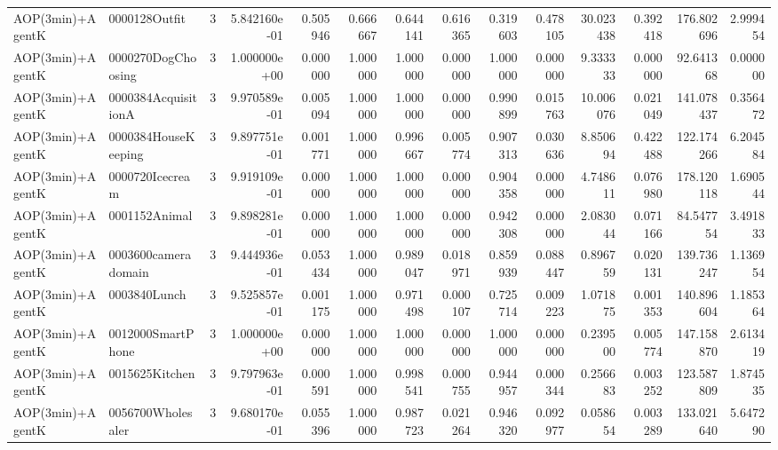 \begin{tabular}{llrr|r|rr|rr|rr|rrr}
         AOP(3min)+AgentK &          0000128Outfit &       3 & 5.842160e-01 & 0.505946 & 0.666667 &      0.644141 & 0.616365 &      0.319603 & 0.478105 &     30.023438 &    0.392418 &   176.802696 &    2.999454 \\
         AOP(3min)+AgentK &     0000270DogChoosing &       3 & 1.000000e+00 & 0.000000 & 1.000000 &      1.000000 & 0.000000 &      1.000000 & 0.000000 &      9.333333 &    0.000000 &    92.641368 &    0.000000 \\
         AOP(3min)+AgentK &    0000384AcquisitionA &       3 & 9.970589e-01 & 0.005094 & 1.000000 &      1.000000 & 0.000000 &      0.990899 & 0.015763 &     10.006076 &    0.021049 &   141.078437 &    0.356472 \\
         AOP(3min)+AgentK &    0000384HouseKeeping &       3 & 9.897751e-01 & 0.001771 & 1.000000 &      0.996667 & 0.005774 &      0.907313 & 0.030636 &      8.850694 &    0.422488 &   122.174266 &    6.204584 \\
         AOP(3min)+AgentK &        0000720Icecream &       3 & 9.919109e-01 & 0.000000 & 1.000000 &      1.000000 & 0.000000 &      0.904358 & 0.000000 &      4.748611 &    0.076980 &   178.120118 &    1.690544 \\
         AOP(3min)+AgentK &          0001152Animal &       3 & 9.898281e-01 & 0.000000 & 1.000000 &      1.000000 & 0.000000 &      0.942308 & 0.000000 &      2.083044 &    0.071166 &    84.547754 &    3.491833 \\
         AOP(3min)+AgentK &    0003600cameradomain &       3 & 9.444936e-01 & 0.053434 & 1.000000 &      0.989047 & 0.018971 &      0.859939 & 0.088447 &      0.896759 &    0.020131 &   139.736247 &    1.136954 \\
         AOP(3min)+AgentK &           0003840Lunch &       3 & 9.525857e-01 & 0.001175 & 1.000000 &      0.971498 & 0.000107 &      0.725714 & 0.009223 &      1.071875 &    0.001353 &   140.896604 &    1.185364 \\
         AOP(3min)+AgentK &      0012000SmartPhone &       3 & 1.000000e+00 & 0.000000 & 1.000000 &      1.000000 & 0.000000 &      1.000000 & 0.000000 &      0.239500 &    0.005774 &   147.158870 &    2.613419 \\
         AOP(3min)+AgentK &         0015625Kitchen &       3 & 9.797963e-01 & 0.000591 & 1.000000 &      0.998541 & 0.000755 &      0.944957 & 0.000344 &      0.256683 &    0.003252 &   123.587809 &    1.874535 \\
         AOP(3min)+AgentK &      0056700Wholesaler &       3 & 9.680170e-01 & 0.055396 & 1.000000 &      0.987723 & 0.021264 &      0.946320 & 0.092977 &      0.058654 &    0.003289 &   133.021640 &    5.647290 \\

\end{tabular}
